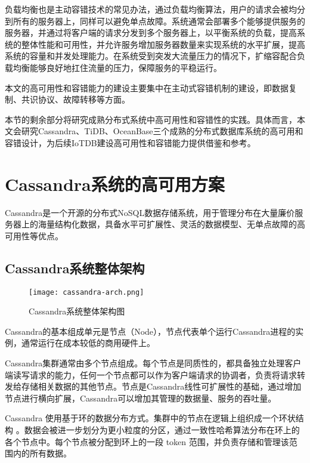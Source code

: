 负载均衡也是主动容错技术的常见办法，通过负载均衡算法，用户的请求会被均分到所有的服务器上，同样可以避免单点故障。系统通常会部署多个能够提供服务的服务器，并通过将客户端的请求分发到多个服务器上，以平衡系统的负载，提高系统的整体性能和可用性，并允许服务增加服务器数量来实现系统的水平扩展，提高系统的容量和并发处理能力。在系统受到突发大流量压力的情况下，扩缩容配合负载均衡能够良好地扛住流量的压力，保障服务的平稳运行。



本文的高可用性和容错能力的建设主要集中在主动式容错机制的建设，即数据复制、共识协议、故障转移等方面。

本节的剩余部分将研究成熟分布式系统中高可用性和容错性的实践。具体而言，本文会研究Cassandra、TiDB、OceanBase三个成熟的分布式数据库系统的高可用和容错设计，为后续IoTDB建设高可用性和容错能力提供借鉴和参考。



\section{Cassandra系统的高可用方案}
Cassandra\cite{lakshman2010cassandra}是一个开源的分布式NoSQL数据存储系统，用于管理分布在大量廉价服务器上的海量结构化数据，具备水平可扩展性、灵活的数据模型、无单点故障的高可用性等优点。

\subsection{Cassandra系统整体架构}

\begin{figure}
  \centering
  \texttt{[image: cassandra-arch.png]}
  \caption{Cassandra系统整体架构图}
  \label{fig:cassandra-arch}
\end{figure}

Cassandra的基本组成单元是节点（Node），节点代表单个运行Cassandra进程的实例，通常运行在成本较低的商用硬件上。

Cassandra集群通常由多个节点组成。每个节点是同质性的，都具备独立处理客户端读写请求的能力，任何一个节点都可以作为客户端请求的协调者，负责将请求转发给存储相关数据的其他节点。节点是Cassandra线性可扩展性的基础，通过增加节点进行横向扩展，Cassandra可以增加其管理的数据量、服务的吞吐量。

Cassandra 使用基于环的数据分布方式。集群中的节点在逻辑上组织成一个环状结构 。数据会被进一步划分为更小粒度的分区，通过一致性哈希算法\cite{karger1997consistent}分布在环上的各个节点中。每个节点被分配到环上的一段 token 范围，并负责存储和管理该范围内的所有数据。

